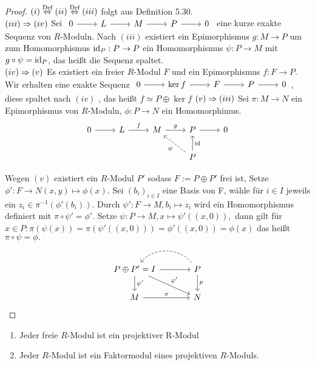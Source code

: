 \begin{proof}
	$(i) \overset{\text{Def}}{\Leftrightarrow} (ii) \overset{\text{Def}}{\Leftrightarrow} (iii) $ folgt aus Definition 5.30. \\
	$(iii) \Rightarrow (iv) $ Sei $\begin{tikzcd}
	0  \arrow{r} & L \arrow{r} & M \arrow{r} & P \arrow{r} & 0
	\end{tikzcd} $
	 eine kurze exakte Sequenz von $R$-Moduln. Nach $(iii)$ existiert ein Epimorphismus $ g: M \to P $ um zum Homomorphismus $\operatorname{id}_P: P \to P $ ein Homomorphismus $ \psi: P \to M $  mit $ g \circ \psi = \operatorname{id}_P$, das heißt die Sequenz spaltet. \\
	$(iv) \Rightarrow (v) $ Es existiert ein freier $R$-Modul $F$ und ein Epimorphismus $ f: F \to P $. Wir erhalten eine exakte Sequenz $\begin{tikzcd}
	0  \arrow{r} & \ker f \arrow{r} & F \arrow{r} & P \arrow{r} & 0
	\end{tikzcd} $, diese spaltet nach $(iv)$ , das heißt $ f \simeq P \oplus \ker f $
	$(v) \Rightarrow (iii)$ Sei $ \pi: M \to N$ ein Epimorphismus von $R$-Moduln, $\phi: P \to N $ ein Homomorphimus. 
	$$\begin{tikzcd}
	0 \arrow{r} & L \arrow{r}{f} & M \arrow{r}{g} & P \arrow{r} & 0 \\
	& & & P \arrow[dashed]{ul}{\psi} \arrow[swap]{u}{\id} & 
	\end{tikzcd}$$
	
	Wegen $(v)$ existiert ein $R$-Modul $P' $ sodass $F:= P \oplus P' $ frei ist, Setze $\phi': F \to N (x,y) \mapsto \phi(x). $ Sei $ (b_i)_{i \in I} $ eine Basis von F, wähle für $i \in I $ jeweils ein $ z_i \in \pi^{-1}(\phi'(b_i)) .$ Durch $\psi': F \to M , b_i \mapsto z_i $ wird ein Homomorphismus definiert mit $ \pi \circ \psi' = \phi'.$ Setze $\psi: P \to M , x \mapsto \psi'((x,0)) ,$ dann gilt für $x \in P: \pi(\psi(x)) = \pi(\psi'((x,0)))= \phi'((x,0)) = \phi(x) $ das heißt $\pi \circ \psi = \phi.$
	$$\begin{tikzcd}[column sep = large]
	P \oplus P' = I \arrow{dr}{\phi '} \arrow{d}{\psi'} \arrow{r} & P \arrow{d}{p} \arrow[dashed, bend right = 50]{l} \\
	M \arrow{r}{\pi} & N
	\end{tikzcd}$$
\end{proof}
\begin{fo}
	\begin{enumerate} [label= \alph*)]
		\item Jeder freie $R$-Modul ist ein projektiver R-Modul
		\item Jeder $R$-Modul ist ein Faktormodul eines projektiven $R$-Moduls. 
	\end{enumerate}
\end{fo}
